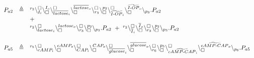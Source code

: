 {\small
\[
\begin{array}{lcl}
P_{a2} & \triangleq& {}^{r_2}\backslash_{I_i}^{\scriptstyle {\square}}\backslash_{\scriptstyle {\square}}^{I_o}\backslash_{\overline{lactose}_i}^{\scriptstyle {\square}}\backslash_{\scriptstyle {\square}}^{\overline{lactose}_o}
\backslash_{r_3}^{\scriptstyle {\square}}\backslash_{\scriptstyle {\square}}^{p_2}
\backslash_{\widetilde{I\textrm{-}OP}_i}^{\scriptstyle {\square}}\backslash_{\scriptstyle {\square}}^{\widetilde{I\textrm{-}OP}_o}\backslash_{p_3}.P_{a2}  \\
&&+\\
 && {}^{r_2}\backslash_{lactose_i}^{\scriptstyle {\square}}\backslash_{\scriptstyle {\square}}^{lactose_o}\backslash_{r_3}^{\scriptstyle {\square}}\backslash_{\scriptstyle {\square}}^{p_2}\backslash_{p_3}.P_{a2} \ +\  {}^{r_2}\backslash_{\overline{I}_i}^{\scriptstyle {\square}}\backslash_{\scriptstyle {\square}}^{\overline{I}_o}\backslash_{r_3}^{\scriptstyle {\square}}\backslash_{\scriptstyle {\square}}^{p_2}\backslash_{p_3}.P_{a2}\\[5pt]
 \\
P_{a5} & \triangleq& {}^{r_5}\backslash_{cAMP_i}^{\scriptstyle {\square}}\backslash_{\scriptstyle {\square}}^{cAMP_o}
\backslash_{CAP_i}^{\scriptstyle {\square}}\backslash_{\scriptstyle {\square}}^{CAP_o}\backslash_{\overline{glucose}_i}^{\scriptstyle {\square}}
\backslash_{\scriptstyle {\square}}^{\overline{glucose}_o}\backslash_{r_6}^{\scriptstyle {\square}}
\backslash_{\scriptstyle {\square}}^{p_5}
\backslash_{\widetilde{cAMP\textrm{-}CAP}_i}^{\scriptstyle {\square}}\backslash_{\scriptstyle {\square}}^{\widetilde{cAMP\textrm{-}CAP}_o}
\backslash_{p_6}.P_{a5}\\

\end{array}\]}
